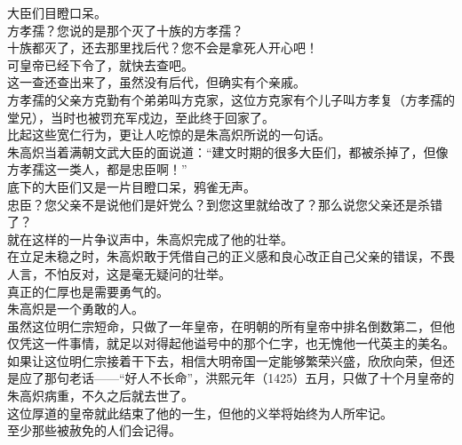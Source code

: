 \begin{multicols}{\theparacolNo}
大臣们目瞪口呆。\\

方孝孺？您说的是那个灭了十族的方孝孺？\\

十族都灭了，还去那里找后代？您不会是拿死人开心吧！\\

可皇帝已经下令了，就快去查吧。\\

这一查还查出来了，虽然没有后代，但确实有个亲戚。\\

方孝孺的父亲方克勤有个弟弟叫方克家，这位方克家有个儿子叫方孝复（方孝孺的堂兄），当时也被罚充军戍边，至此终于回家了。\\

比起这些宽仁行为，更让人吃惊的是朱高炽所说的一句话。\\

朱高炽当着满朝文武大臣的面说道：“建文时期的很多大臣们，都被杀掉了，但像方孝孺这一类人，都是忠臣啊！”\\

底下的大臣们又是一片目瞪口呆，鸦雀无声。\\

忠臣？您父亲不是说他们是奸党么？到您这里就给改了？那么说您父亲还是杀错了？\\

就在这样的一片争议声中，朱高炽完成了他的壮举。\\

在立足未稳之时，朱高炽敢于凭借自己的正义感和良心改正自己父亲的错误，不畏人言，不怕反对，这是毫无疑问的壮举。\\

真正的仁厚也是需要勇气的。\\

朱高炽是一个勇敢的人。\\

虽然这位明仁宗短命，只做了一年皇帝，在明朝的所有皇帝中排名倒数第二，但他仅凭这一件事情，就足以对得起他谥号中的那个仁字，也无愧他一代英主的美名。\\

如果让这位明仁宗接着干下去，相信大明帝国一定能够繁荣兴盛，欣欣向荣，但还是应了那句老话——“好人不长命”，洪熙元年（1425）五月，只做了十个月皇帝的朱高炽病重，不久之后就去世了。\\

这位厚道的皇帝就此结束了他的一生，但他的义举将始终为人所牢记。\\

至少那些被赦免的人们会记得。\\


\end{multicols}
